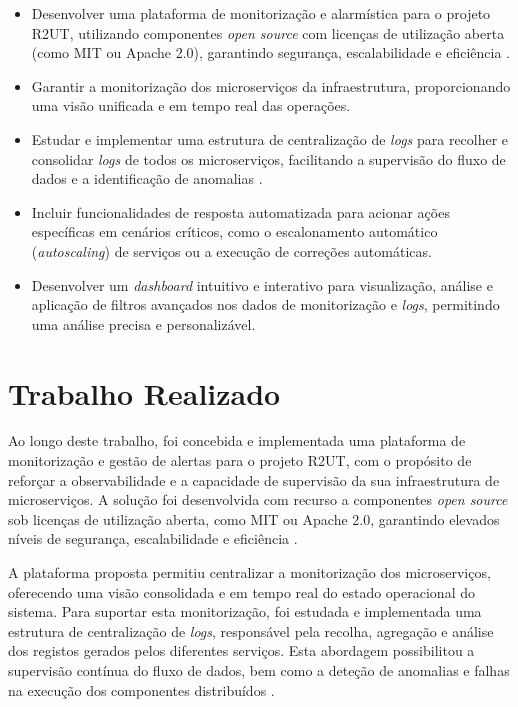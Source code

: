 \begin{itemize}
    \item Desenvolver uma plataforma de monitorização e alarmística para o projeto R2UT, utilizando componentes \textit{open source} com licenças de utilização aberta (como MIT ou Apache 2.0), garantindo segurança, escalabilidade e eficiência \cite{Mayer2017}. 
    \item Garantir a monitorização dos microserviços da infraestrutura, proporcionando uma visão unificada e em tempo real das operações.
    \item Estudar e implementar uma estrutura de centralização de \textit{logs} para recolher e consolidar \textit{logs} de todos os microserviços, facilitando a supervisão do fluxo de dados e a identificação de anomalias \cite{Cinque2022}.
    \item Incluir funcionalidades de resposta automatizada para acionar ações específicas em cenários críticos, como o escalonamento automático (\textit{autoscaling}) de serviços ou a execução de correções automáticas. 
    \item Desenvolver um \textit{dashboard} intuitivo e interativo para visualização, análise e aplicação de filtros avançados nos dados de monitorização e \textit{logs}, permitindo uma análise precisa e personalizável. 
\end{itemize}

\break

\section{Trabalho Realizado}

Ao longo deste trabalho, foi concebida e implementada uma plataforma de monitorização e gestão de alertas para o projeto R2UT, com o propósito de reforçar a observabilidade e a capacidade de supervisão da sua infraestrutura de microserviços. A solução foi desenvolvida com recurso a componentes \textit{open source} sob licenças de utilização aberta, como MIT ou Apache 2.0, garantindo elevados níveis de segurança, escalabilidade e eficiência \cite{Mayer2017}.

A plataforma proposta permitiu centralizar a monitorização dos microserviços, oferecendo uma visão consolidada e em tempo real do estado operacional do sistema. Para suportar esta monitorização, foi estudada e implementada uma estrutura de centralização de \textit{logs}, responsável pela recolha, agregação e análise dos registos gerados pelos diferentes serviços. Esta abordagem possibilitou a supervisão contínua do fluxo de dados, bem como a deteção de anomalias e falhas na execução dos componentes distribuídos \cite{Cinque2022}.

